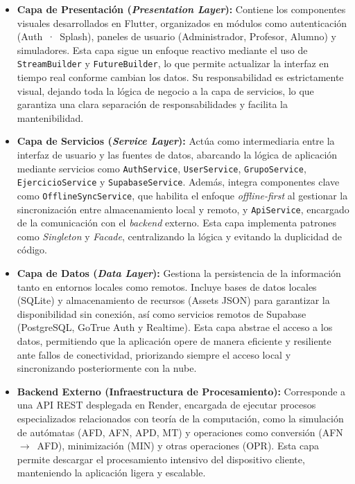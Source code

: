 \begin{itemize}
    \item \textbf{Capa de Presentación (\textit{Presentation Layer}):} Contiene los componentes
    visuales desarrollados en Flutter, organizados en módulos como autenticación (Auth~·~Splash),
    paneles de usuario (Administrador, Profesor, Alumno) y simuladores. Esta capa sigue un enfoque
    reactivo mediante el uso de \texttt{StreamBuilder} y \texttt{FutureBuilder}, lo que permite
    actualizar la interfaz en tiempo real conforme cambian los datos. Su responsabilidad es
    estrictamente visual, dejando toda la lógica de negocio a la capa de servicios, lo que
    garantiza una clara separación de responsabilidades y facilita la mantenibilidad.

    \item \textbf{Capa de Servicios (\textit{Service Layer}):} Actúa como intermediaria entre la
    interfaz de usuario y las fuentes de datos, abarcando la lógica de aplicación mediante
    servicios como \texttt{AuthService}, \texttt{UserService}, \texttt{GrupoService},
    \texttt{EjercicioService} y \texttt{SupabaseService}. Además, integra componentes clave como
    \texttt{OfflineSyncService}, que habilita el enfoque \textit{offline-first} al gestionar la
    sincronización entre almacenamiento local y remoto, y \texttt{ApiService}, encargado de la
    comunicación con el \textit{backend} externo. Esta capa implementa patrones como
    \textit{Singleton} y \textit{Facade}, centralizando la lógica y evitando la duplicidad de
    código.

    \item \textbf{Capa de Datos (\textit{Data Layer}):} Gestiona la persistencia de la información
    tanto en entornos locales como remotos. Incluye bases de datos locales (SQLite) y
    almacenamiento de recursos (Assets JSON) para garantizar la disponibilidad sin conexión, así
    como servicios remotos de Supabase (PostgreSQL, GoTrue Auth y Realtime). Esta capa abstrae el
    acceso a los datos, permitiendo que la aplicación opere de manera eficiente y resiliente ante
    fallos de conectividad, priorizando siempre el acceso local y sincronizando posteriormente con
    la nube.

    \item \textbf{Backend Externo (Infraestructura de Procesamiento):} Corresponde a una API REST
    desplegada en Render, encargada de ejecutar procesos especializados relacionados con teoría de
    la computación, como la simulación de autómatas (AFD, AFN, APD, MT) y operaciones como
    conversión (AFN~$\rightarrow$~AFD), minimización (MIN) y otras operaciones (OPR). Esta capa
    permite descargar el procesamiento intensivo del dispositivo cliente, manteniendo la aplicación
    ligera y escalable.


\end{itemize}
